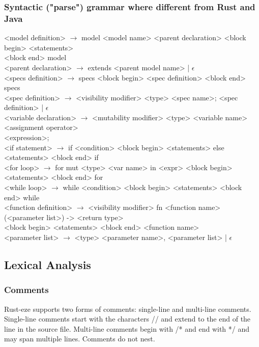 \documentclass[letterpaper, 10pt, DIV=13]{scrartcl}
\numberwithin{equation}{section}
\numberwithin{figure}{section}
\numberwithin{table}{section}
\begin{document}
\subsubsection{Syntactic ("parse") grammar where different from Rust and Java}
<model definition> $\rightarrow$ model <model name> <parent declaration> 
                                 <block begin> <statements> \\
                                 \hspace*{3.5cm}<block end> model \\
<parent declaration> $\rightarrow$ extends <parent model name> | $\epsilon$ \\
<specs definition> $\rightarrow$ specs <block begin> <spec definition> <block end> specs \\
<spec definition> $\rightarrow$ <visibility modifier> <type> <spec name>;
                                <spec definition> | $\epsilon$ \\
<variable declaration> $\rightarrow$ <mutability modifier> <type> <variable name>
                                     <assignment operator>\\
                                     \hspace*{4.2cm}<expression>; \\
<if statement> $\rightarrow$ if <condition> <block begin> <statements> else <statements> <block end> if \\
<for loop> $\rightarrow$ for mut <type> <var name> in <expr> <block begin>
                         <statements> <block end> for \\
<while loop> $\rightarrow$ while <condition> <block begin> <statements> <block end> while \\
<function definition> $\rightarrow$ <visibility modifier> fn <function name>
                                    (<parameter list>) -> <return type> \\
                                    \hspace*{4cm}<block begin> <statements> <block end> <function name>\\
<parameter list> $\rightarrow$ <type> <parameter name>, <parameter list> | $\epsilon$

\subsection{Lexical Analysis}
\subsubsection{Comments}
Rust-eze supports two forms of comments: single-line and multi-line comments.
Single-line comments start with the characters // and extend to the end of the
line in the source file. Multi-line comments begin with /* and end with */ and
may span multiple lines. Comments do not nest.
\end{document}
